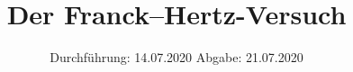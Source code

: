 

\subject{Versuch Nr. 601}
\title{Der Franck--Hertz-Versuch} %
\date{%
  Durchführung: 14.07.2020
  \hspace{3em}
  Abgabe: 21.07.2020
}


\setlength{\parindent}{0pt} %

\maketitle
\thispagestyle{empty}
\tableofcontents
\newpage








\printbibliography{}


